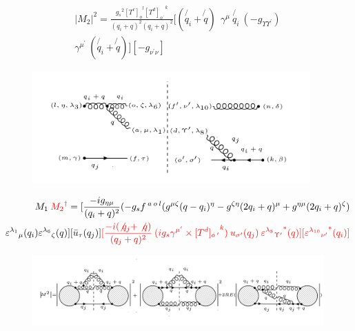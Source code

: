 \begin{equation}
\begin{split}
|M_2|^2=\frac{{g_s}^2 {[T^c]_o}^l {[T^d]_{o\:^{\prime}}}^k}{(q_i + q)^2 (q_i + q)^2}
[(\not{q_i} + \not{q}) \:
 \:  \gamma^{\mu} \: \not{q_i} \: (-g_{{\Upsilon}{{\Upsilon}^{\prime}}}) \\
\gamma^{{\mu}^{\prime}} \: (\not{q_i} + \not{q})]
[-g_{{\nu}^{\prime}{\nu}}]
\end{split}
\end{equation}
\begin{figure}[ht!]
\centering
\includegraphics[width=0.95\textwidth]{images/ggqM1M2dagger.png}
\end{figure}
\begin{equation}
\begin{split}
M_1\:{\color[RGB]{255,0,0} {M_2}^{\dagger}}=[\frac{-ig_{{\eta}{\mu}}}{(q_i +q)^2}(-g_s f^{\:a\:o\:l}(g^{{\mu}{\zeta}}(q-q_i)^{\eta}-g^{{\zeta}{\eta}}(2q_i +q)^{\mu}+g^{{\eta}{\mu}}(2q_i +q)^{\zeta})\\
{\varepsilon^{\lambda_1}}_{\mu} (q_i) {\varepsilon^{\lambda_6}}_{\zeta} (q)][\bar{u}_{\tau}(q_j)]
{\color[RGB]{255,0,0}[\frac{-i(\not{q_j} + \not{q})}{(q_j + q)^2} \:  (ig_s \gamma^{{\mu}^{\prime}}\times {[T^d]_{o\:^{\prime}}}^k) \: u_{{\sigma}^{\prime}}(q_j) \: {{\varepsilon^{\lambda_8}}_{{\Upsilon}^{\prime}}}^* (q)][{{\varepsilon^{\lambda_{10}}}_{{\nu}^{\prime}}}^* (q_i)]}
\end{split}
\end{equation}









%

\begin{figure}[ht!]
\centering
\includegraphics[width=1.0\textwidth]{images/ggq-MSquerRE.png}

\end{figure}
